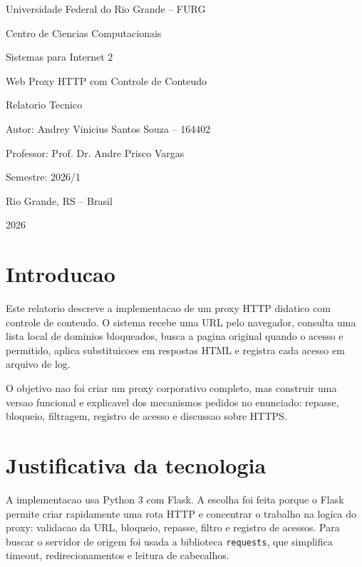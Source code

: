 \documentclass[12pt,a4paper]{article}
\begin{document}
\sloppy

\hypersetup{pageanchor=false}
\begin{titlepage}
\centering
{\large Universidade Federal do Rio Grande -- FURG\par}
{\large Centro de Ciencias Computacionais\par}
{\large Sistemas para Internet 2\par}
\vfill
{\Huge Web Proxy HTTP com Controle de Conteudo\par}
\vspace{1.5cm}
{\Large Relatorio Tecnico\par}
\vfill
{\large Autor: Andrey Vinicius Santos Souza -- 164402\par}
{\large Professor: Prof. Dr. Andre Prisco Vargas\par}
{\large Semestre: 2026/1\par}
\vfill
{\large Rio Grande, RS -- Brasil\par}
{\large 2026\par}
\end{titlepage}

\hypersetup{pageanchor=true}
\setcounter{page}{1}
\tableofcontents
\newpage

\section{Introducao}

Este relatorio descreve a implementacao de um proxy HTTP didatico com controle de conteudo. O sistema recebe uma URL pelo navegador, consulta uma lista local de dominios bloqueados, busca a pagina original quando o acesso e permitido, aplica substituicoes em respostas HTML e registra cada acesso em arquivo de log.

O objetivo nao foi criar um proxy corporativo completo, mas construir uma versao funcional e explicavel dos mecanismos pedidos no enunciado: repasse, bloqueio, filtragem, registro de acesso e discussao sobre HTTPS.

\section{Justificativa da tecnologia}

A implementacao usa Python 3 com Flask. A escolha foi feita porque o Flask permite criar rapidamente uma rota HTTP e concentrar o trabalho na logica do proxy: validacao da URL, bloqueio, repasse, filtro e registro de acessos. Para buscar o servidor de origem foi usada a biblioteca \texttt{requests}, que simplifica timeout, redirecionamentos e leitura de cabecalhos.
\end{document}
